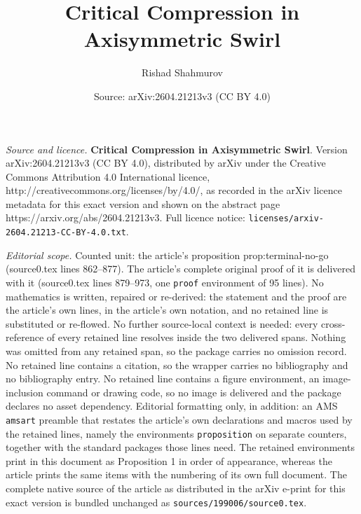 \documentclass[10pt,a4paper]{amsart}
\title{\textbf{Critical Compression in Axisymmetric Swirl}}
\author{Rishad Shahmurov}
\date{Source: arXiv:2604.21213v3 (CC BY 4.0)}
\begin{document}
\maketitle

\noindent\emph{Source and licence.} \textbf{Critical Compression in Axisymmetric Swirl}. Version arXiv:2604.21213v3 (CC BY 4.0), distributed by arXiv under the Creative Commons Attribution 4.0 International licence, http://creativecommons.org/licenses/by/4.0/, as recorded in the arXiv licence metadata for this exact version and shown on the abstract page https://arxiv.org/abs/2604.21213v3. Full licence notice: \texttt{licenses/arxiv-2604.21213-CC-BY-4.0.txt}.\par\smallskip

\noindent\textit{Editorial scope.} Counted unit: the article's proposition prop:terminal-no-go (source0.tex lines 862--877). The article's complete original proof of it is delivered with it (source0.tex lines 879--973, one \texttt{proof} environment of 95 lines). No mathematics is written, repaired or re-derived: the statement and the proof are the article's own lines, in the article's own notation, and no retained line is substituted or re-flowed.  No further source-local context is needed: every cross-reference of every retained line resolves inside the two delivered spans.  Nothing was omitted from any retained span, so the package carries no omission record.  No retained line contains a citation, so the wrapper carries no bibliography and no bibliography entry.  No retained line contains a figure environment, an image-inclusion command or drawing code, so no image is delivered and the package declares no asset dependency.  Editorial formatting only, in addition: an AMS \texttt{amsart} preamble that restates the article's own declarations and macros used by the retained lines, namely the environments \texttt{proposition} on separate counters, together with the standard packages those lines need.  The retained environments print in this document as Proposition 1 in order of appearance, whereas the article prints the same items with the numbering of its own full document.  The complete native source of the article as distributed in the arXiv e-print for this exact version is bundled unchanged as \texttt{sources/199006/source0.tex}.
\end{document}
